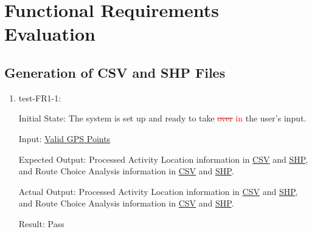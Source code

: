 \documentclass[12pt, titlepage]{article}
\begin{document}
\newpage

\tableofcontents

\listoftables %

\listoffigures %

\newpage


\section{Functional Requirements Evaluation}

\subsection{Generation of CSV and SHP Files}
\begin{enumerate}
    \item test-FR1-1:\label{test-FR1-1}
    
    Initial State: The system is set up and ready to take \textcolor{red}{\sout{over} in} the user's input.
    
    Input: \href{https://github.com/paezha/PyERT-BLACK/blob/rev0-test/quarto-example/data/sample-gps/sample-gps-1.csv}{Valid GPS Points}
    
    Expected Output: Processed Activity Location information in \href{https://github.com/paezha/PyERT-BLACK/blob/rev0-test/test/test_data/fr-tests/fr1-1-expected-aloc.csv}{CSV} and \href{https://github.com/paezha/PyERT-BLACK/blob/rev0-test/test/test_data/fr-tests/fr1-1-expected-aloc.shp}{SHP}, and Route Choice Analysis information in \href{https://github.com/paezha/PyERT-BLACK/blob/rev0-test/test/test_data/fr-tests/fr1-1-expected-rca.csv}{CSV} and \href{https://github.com/paezha/PyERT-BLACK/blob/rev0-test/test/test_data/fr-tests/fr1-1-expected-rca.shp}{SHP}.
    
    Actual Output: Processed Activity Location information in \href{https://github.com/paezha/PyERT-BLACK/blob/rev0-test/test/test_data/fr-tests/fr1-1-out-aloc.csv}{CSV} and \href{https://github.com/paezha/PyERT-BLACK/blob/rev0-test/test/test_data/fr-tests/fr1-1-out-aloc.shp}{SHP}, and Route Choice Analysis information in \href{https://github.com/paezha/PyERT-BLACK/blob/rev0-test/test/test_data/fr-tests/fr1-1-out-rca.csv}{CSV} and \href{https://github.com/paezha/PyERT-BLACK/blob/rev0-test/test/test_data/fr-tests/fr1-1-out-rca.shp}{SHP}.
    
    Result: Pass
\end{enumerate}
\end{document}
